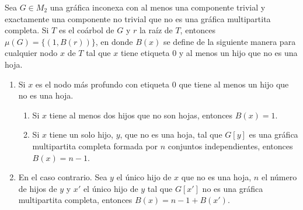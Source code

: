 \begin{lemma}\label{lema_parejas_03}
Sea $G \in M_2$ una gráfica inconexa con al menos una componente trivial y
exactamente una componente no trivial que no es una gráfica multipartita
completa.   Si $T$ es el coárbol de $G$ y $r$ la raíz de $T$, entonces
$\mu(G) = \{(1,B(r))\}$, en donde $B(x)$ se define de la siguiente manera
para cualquier nodo $x$ de $T$ tal que $x$ tiene etiqueta 0 y al menos un
hijo que no es una hoja.
\begin{enumerate}
    \item Si $x$ es el nodo más profundo con etiqueta 0 que tiene al menos un hijo que no es una hoja.
    \begin{enumerate}
        \item Si $x$ tiene al menos dos hijos que no son hojas, entonces $B(x) = 1$.
        \item Si $x$ tiene un solo hijo, $y$, que no es una hoja, tal que $G[y]$ es una gráfica multipartita completa formada por $n$ conjuntos independientes, entonces $B(x) = n-1$.
    \end{enumerate}
    \item En el caso contrario. Sea $y$ el único hijo de $x$ que no es una hoja, $n$ el número de hijos de $y$ y $x'$ el único hijo de $y$ tal que $G[x']$ no es una gráfica multipartita completa, entonces $B(x) = n-1 + B(x')$.
\end{enumerate}
\end{lemma}

